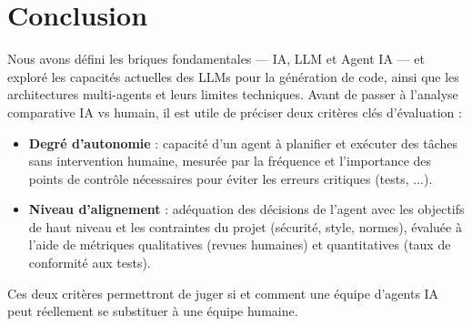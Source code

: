 \section{Conclusion}

Nous avons défini les briques fondamentales — IA, LLM et Agent IA — et exploré les capacités actuelles des LLMs pour la génération de code, ainsi que les architectures multi-agents et leurs limites techniques.  
Avant de passer à l’analyse comparative IA vs humain, il est utile de préciser deux critères clés d’évaluation :

\begin{itemize}
  \item \textbf{Degré d’autonomie} : capacité d’un agent à planifier et exécuter des tâches sans intervention humaine, mesurée par la fréquence et l’importance des points de contrôle nécessaires pour éviter les erreurs critiques (tests, ...).
  \item \textbf{Niveau d’alignement} : adéquation des décisions de l’agent avec les objectifs de haut niveau et les contraintes du projet (sécurité, style, normes), évaluée à l’aide de métriques qualitatives (revues humaines) et quantitatives (taux de conformité aux tests).
\end{itemize}

Ces deux critères permettront de juger si et comment une équipe d’agents IA peut réellement se substituer à une équipe humaine.
